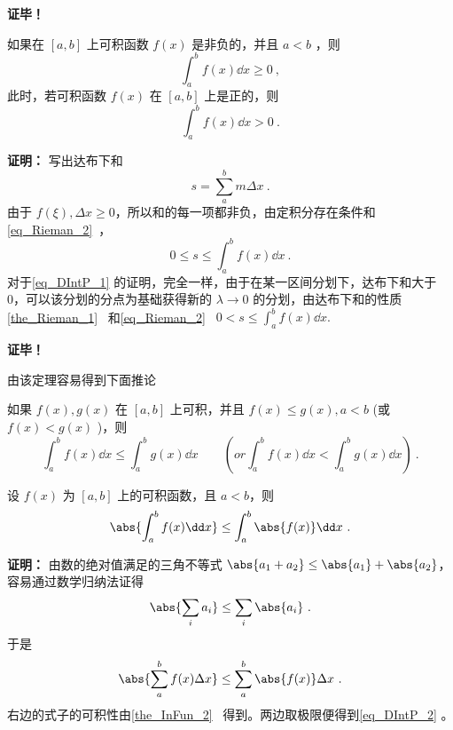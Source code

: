 \textbf{证毕！} 

\begin{theorem}{}
如果在 $[a,b]$ 上可积函数 $f(x)$ 是非负的，并且 $a<b$ ，则
\begin{equation}
\int_a^b f(x)\dd x\geq0~,
\end{equation}
此时，若可积函数 $f(x)$ 在 $[a,b]$ 上是正的，则
\begin{equation}\label{eq_DIntP_1}
\int_a^b f(x)\dd x>0~.
\end{equation}
\end{theorem}
\textbf{证明：}
写出达布下和
\begin{equation}
s=\sum_{a}^bm\Delta x~.
\end{equation}
由于 $f(\xi),\Delta x\geq0$，所以和的每一项都非负，由定积分存在条件和\autoref{eq_Rieman_2}~，
\begin{equation}
0\leq s\leq\int_a^b f(x)\dd x~.
\end{equation}
对于\autoref{eq_DIntP_1} 的证明，完全一样，由于在某一区间分划下，达布下和大于0，可以该分划的分点为基础获得新的 $\lambda\rightarrow0$ 的分划，由达布下和的性质\autoref{the_Rieman_1}~ 和\autoref{eq_Rieman_2}~ 
$0<s\leq\int_a^b f(x)\dd x.$

\textbf{证毕！}

由该定理容易得到下面推论
\begin{corollary}{}\label{cor_DIntP_1}
如果 $f(x),g(x)$ 在 $[a,b]$ 上可积，并且 $f(x)\leq g(x),a<b$ (或 $f(x)< g(x)$ )，则
\begin{equation}
\int_a^b f(x)\dd x\leq\int_a^b g(x)\dd x\qquad (or \int_a^b f(x)\dd x<\int_a^b g(x)\dd x)~.
\end{equation}

\end{corollary}
\begin{theorem}{}
设 $f(x)$ 为 $[a,b]$ 上的可积函数，且 $a<b$，则
\begin{equation}\label{eq_DIntP_2}
\abs{\int_a^b f(x)\dd x}\leq\int_a^b \abs{f(x)}\dd x~.
\end{equation}
\end{theorem}
\textbf{证明：}
由数的绝对值满足的三角不等式 $\abs{a_1+a_2}\leq\abs{a_1}+\abs{a_2}$，容易通过数学归纳法证得
\begin{equation}
\abs{\sum_i a_i}\leq\sum_i \abs{a_i}~.
\end{equation}
于是
\begin{equation}
\abs{\sum_a^b f(x)\Delta x}\leq\sum_a^b\abs{f(x)}\Delta x~.
\end{equation}
右边的式子的可积性由\autoref{the_InFun_2}~ 得到。两边取极限便得到\autoref{eq_DIntP_2} 。

